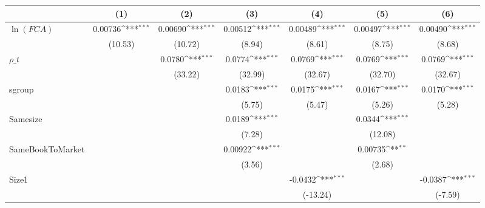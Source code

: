 {
\def\sym#1{\ifmmode^{#1}\else\(^{#1}\)\fi}
\begin{tabular}{l*{6}{c}}
\hline\hline
                    &\multicolumn{1}{c}{(1)}         &\multicolumn{1}{c}{(2)}         &\multicolumn{1}{c}{(3)}         &\multicolumn{1}{c}{(4)}         &\multicolumn{1}{c}{(5)}         &\multicolumn{1}{c}{(6)}         \\
\hline
$\ln(FCA)$          &     0.00736\sym{***}&     0.00690\sym{***}&     0.00512\sym{***}&     0.00489\sym{***}&     0.00497\sym{***}&     0.00490\sym{***}\\
                    &     (10.53)         &     (10.72)         &      (8.94)         &      (8.61)         &      (8.75)         &      (8.68)         \\
[1em]
 $ \rho\_t $         &                     &      0.0780\sym{***}&      0.0774\sym{***}&      0.0769\sym{***}&      0.0769\sym{***}&      0.0769\sym{***}\\
                    &                     &     (33.22)         &     (32.99)         &     (32.67)         &     (32.70)         &     (32.67)         \\
[1em]
sgroup              &                     &                     &      0.0183\sym{***}&      0.0175\sym{***}&      0.0167\sym{***}&      0.0170\sym{***}\\
                    &                     &                     &      (5.75)         &      (5.47)         &      (5.26)         &      (5.28)         \\
[1em]
Samesize            &                     &                     &      0.0189\sym{***}&                     &      0.0344\sym{***}&                     \\
                    &                     &                     &      (7.28)         &                     &     (12.08)         &                     \\
[1em]
SameBookToMarket    &                     &                     &     0.00922\sym{***}&                     &     0.00735\sym{**} &                     \\
                    &                     &                     &      (3.56)         &                     &      (2.68)         &                     \\
[1em]
Size1               &                     &                     &                     &     -0.0432\sym{***}&                     &     -0.0387\sym{***}\\
                    &                     &                     &                     &    (-13.24)         &                     &     (-7.59)         \\

\end{tabular}}
